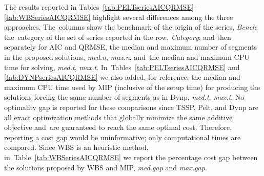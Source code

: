 \documentclass[mathematics,article,accept,pdftex,moreauthors]{Definitions/mdpi}
\begin{document}
The results reported in Tables~\ref{tab:PELTseriesAICQRMSE}--\ref{tab:WBSeriesAICQRMSE} highlight several differences among the three approaches. The~columns show the benchmark of the origin of the series, {\it Bench}; the~category of the set of series reported in the row, {\it Category}; and then separately for AIC and QRMSE, the median and maximum number of segments in the proposed solutions, {\it med.n}, {\it max.n}, and~the median and maximum CPU time for solving, {\it med.t}, {\it max.t}. In~Tables~\ref{tab:PELTseriesAICQRMSE} and \ref{tab:DYNPseriesAICQRMSE} we also added, for reference, the median and maximum CPU time used by MIP (inclusive of the setup time) for producing the solutions forcing the same number of segments as in Dynp, {\it med.t}, {\it max.t}. 
{No optimality gap is reported for these comparisons since TSSP, Pelt, and Dynp are all exact optimization methods that globally minimize the same additive objective and~are guaranteed to reach the same optimal cost. Therefore, reporting a cost gap would be uninformative; only computational times are compared.}
Since WBS is an heuristic method, in~Table~\ref{tab:WBSeriesAICQRMSE} we report the percentage cost gap between the solutions proposed by WBS and MIP, {\it med.gap} and {\it max.gap}.
\end{document}
